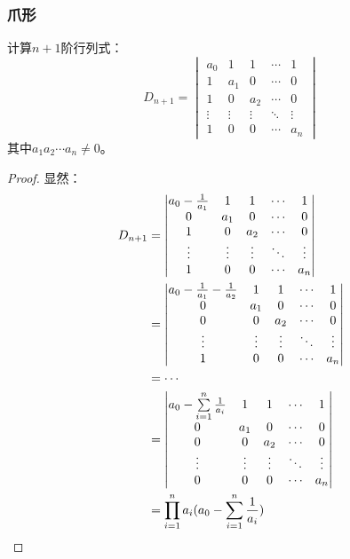 \subsubsection{爪形}
\begin{theorem}
	计算$n+1$阶行列式：
	\begin{equation*}
		D_{n+1}=
		\begin{vmatrix}
			a_0 & 1 & 1 & \cdots & 1 \\
			1 & a_1 & 0 & \cdots & 0 \\
			1 & 0 & a_2 & \cdots & 0 \\
			\vdots & \vdots & \vdots & \ddots & \vdots \\
			1 & 0 & 0 & \cdots & a_n
		\end{vmatrix}
	\end{equation*}
	其中$a_1a_2\cdots a_n\ne0$。
\end{theorem}
\begin{proof}
	显然：
	\begin{align*}
		D_{n+1}&=
		\begin{vmatrix}
			a_0-\frac{1}{a_1} & 1 & 1 & \cdots & 1 \\
			0 & a_1 & 0 & \cdots & 0 \\
			1 & 0 & a_2 & \cdots & 0 \\
			\vdots & \vdots & \vdots & \ddots & \vdots \\
			1 & 0 & 0 & \cdots & a_n
		\end{vmatrix} \\
		&=
		\begin{vmatrix}
			a_0-\frac{1}{a_1}-\frac{1}{a_2} & 1 & 1 & \cdots & 1 \\
			0 & a_1 & 0 & \cdots & 0 \\
			0 & 0 & a_2 & \cdots & 0 \\
			\vdots & \vdots & \vdots & \ddots & \vdots \\
			1 & 0 & 0 & \cdots & a_n
		\end{vmatrix} \\
		&=\cdots \\
		&=
		\begin{vmatrix}
			a_0-\sum\limits_{i=1}^{n}\frac{1}{a_i} & 1 & 1 & \cdots & 1 \\
			0 & a_1 & 0 & \cdots & 0 \\
			0 & 0 & a_2 & \cdots & 0 \\
			\vdots & \vdots & \vdots & \ddots & \vdots \\
			0 & 0 & 0 & \cdots & a_n
		\end{vmatrix} \\
		&=\prod_{i=1}^na_i(a_0-\sum\limits_{i=1}^{n}\frac{1}{a_i})\qedhere
	\end{align*}
\end{proof}
